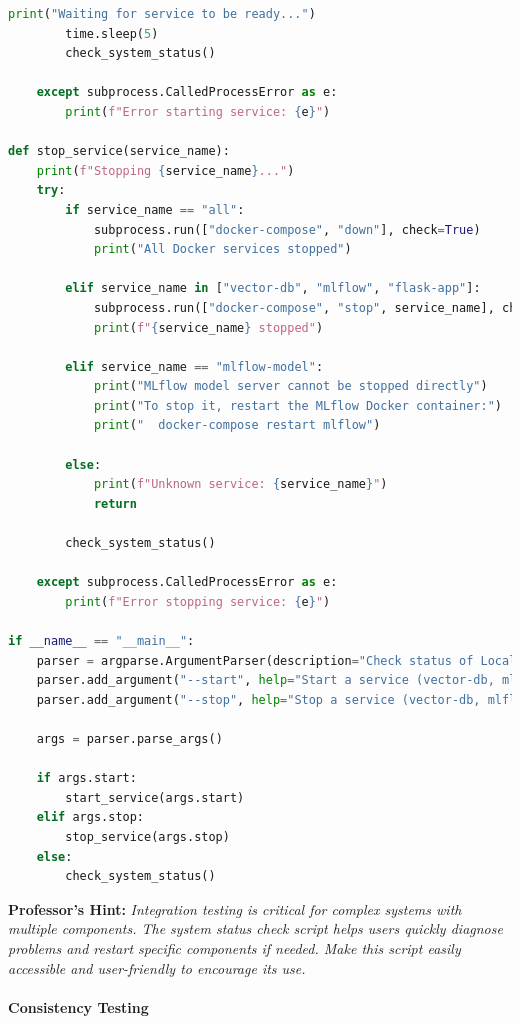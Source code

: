 \documentclass[
  screen,review,acmlarge]{acmart}
\begin{document}
\begin{lstlisting}[language=Python]
        print("Waiting for service to be ready...")
        time.sleep(5)
        check_system_status()
        
    except subprocess.CalledProcessError as e:
        print(f"Error starting service: {e}")

def stop_service(service_name):
    print(f"Stopping {service_name}...")
    try:
        if service_name == "all":
            subprocess.run(["docker-compose", "down"], check=True)
            print("All Docker services stopped")
            
        elif service_name in ["vector-db", "mlflow", "flask-app"]:
            subprocess.run(["docker-compose", "stop", service_name], check=True)
            print(f"{service_name} stopped")
            
        elif service_name == "mlflow-model":
            print("MLflow model server cannot be stopped directly")
            print("To stop it, restart the MLflow Docker container:")
            print("  docker-compose restart mlflow")
            
        else:
            print(f"Unknown service: {service_name}")
            return
            
        check_system_status()
        
    except subprocess.CalledProcessError as e:
        print(f"Error stopping service: {e}")

if __name__ == "__main__":
    parser = argparse.ArgumentParser(description="Check status of Local RAG System")
    parser.add_argument("--start", help="Start a service (vector-db, mlflow, flask-app, mlflow-model, all)")
    parser.add_argument("--stop", help="Stop a service (vector-db, mlflow, flask-app, all)")
    
    args = parser.parse_args()
    
    if args.start:
        start_service(args.start)
    elif args.stop:
        stop_service(args.stop)
    else:
        check_system_status()
\end{lstlisting}

\textbf{Professor's Hint:} \emph{Integration testing is critical for complex systems with multiple components. The system status check script helps users quickly diagnose problems and restart specific components if needed. Make this script easily accessible and user-friendly to encourage its use.}

\paragraph{Consistency Testing}\label{consistency-testing}
\end{document}

